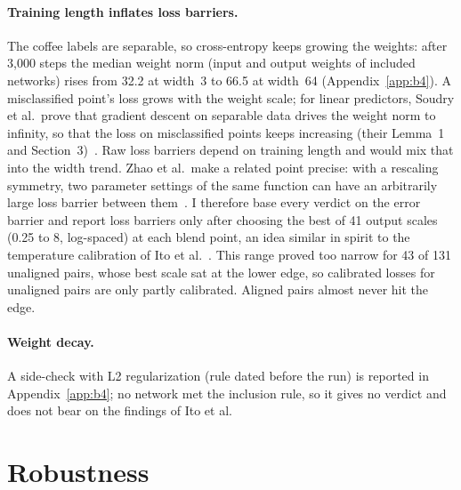 \documentclass[11pt]{article}
\begin{document}
\paragraph{Training length inflates loss barriers.} The coffee labels are separable, so cross-entropy keeps growing the weights: after 3{,}000 steps the median weight norm (input and output weights of included networks) rises from 32.2 at width~3 to 66.5 at width~64 (Appendix~\ref{app:b4}). A misclassified point's loss grows with the weight scale; for linear predictors, Soudry et al.\ prove that gradient descent on separable data drives the weight norm to infinity, so that the loss on misclassified points keeps increasing (their Lemma~1 and Section~3)~\cite{soudry2018implicit}. Raw loss barriers depend on training length and would mix that into the width trend. Zhao et al.\ make a related point precise: with a rescaling symmetry, two parameter settings of the same function can have an arbitrarily large loss barrier between them~\cite[Proposition~5.3]{zhao2025understanding}. I therefore base every verdict on the error barrier and report loss barriers only after choosing the best of 41 output scales (0.25 to 8, log-spaced) at each blend point, an idea similar in spirit to the temperature calibration of Ito et al.~\cite{ito2026permutations}. This range proved too narrow for 43 of 131 unaligned pairs, whose best scale sat at the lower edge, so calibrated losses for unaligned pairs are only partly calibrated. Aligned pairs almost never hit the edge.

\paragraph{Weight decay.} A side-check with L2 regularization (rule dated before the run) is reported in Appendix~\ref{app:b4}; no network met the inclusion rule, so it gives no verdict and does not bear on the findings of Ito et al.

\section{Robustness}
\label{sec:robust}
\end{document}
